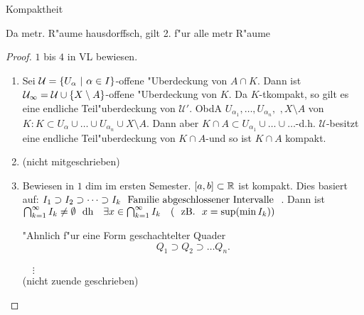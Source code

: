 \documentclass[class=article, crop=false]{standalone}
\begin{document}
\begin{zettel}{Kompaktheit}
    \begin{remark}
    Da metr. R"aume hausdorffsch, gilt 2. f"ur alle metr R"aume
    \end{remark}
    \begin{proof}
        $1$ bis $4$ in VL bewiesen.
        \begin{enumerate}
            \item Sei $\mathcal{U} = \set{U_{\alpha}}{\alpha \in  I}$-offene "Uberdeckung von $A \cap K$. Dann ist $\mathcal{U_{1}}= \mathcal{U}\cup \set{X \setminus  A}$-offene "Uberdeckung von $K$. Da $K$-tkompakt, so gilt es eine endliche Teil"uberdeckung von $\mathcal{U}'$. ObdA $U_{\alpha_1}, \dots, U_{\alpha_n}, $  $,X \setminus A$ von $K: K \subset  U_{\alpha} \cup \dots \cup U_{\alpha_{n}} \cup X \setminus A$. Dann aber $K \cap  A \subset U_{\alpha_{1}} \cup  \dots \cup \dots$-d.h. $\mathcal{U}$-besitzt eine endliche Teil"uberdeckung von $K \cap  A$-und so ist $K \cap  A $ kompakt.
            \item (nicht mitgeschrieben)
            \item Bewiesen in $1$ dim im ersten Semester. $[a,b]  \subset \mathbb{R} $ ist kompakt. Dies basiert auf:
$I_1 \supset I_2 \supset  \dots \supset I_k \tx{ Familie abgeschlossener Intervalle } $. Dann ist 
    $\bigcap_{k=1}^{\infty} I_k \neq  \emptyset \tx{ dh }  \exists x \in  \bigcap_{k=1}^{\infty} I_k \quad (\tx{ zB. } x =\sup(\min I_k))$

"Ahnlich f"ur eine Form geschachtelter Quader
\[
Q_1 \supset Q_2 \supset \dots Q_n
.\]\\
    $\quad\vdots$ \\
(nicht zuende geschrieben)

        \end{enumerate}
    \end{proof}
\end{zettel}
\end{document}
